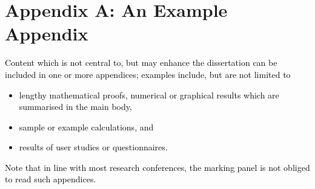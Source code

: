 \documentclass[a4paper]{article}
\newcommand\liststyleWWNumxix{%
\renewcommand\labelitemi{[F0B7?]}
\renewcommand\labelitemii{o}
\renewcommand\labelitemiii{[F0A7?]}
\renewcommand\labelitemiv{[F0B7?]}
}
\begin{document}
\bigskip

\clearpage
\bigskip


\bigskip

\section{Appendix A: An Example Appendix}
\hypertarget{Toc98342040}{}
\bigskip


\bigskip

\textcolor{black}{Content which is not central to, but may enhance the dissertation can be included in one or more
appendices; examples include, but are not limited to}


\bigskip

\liststyleWWNumxix
\begin{itemize}
\item \textcolor{black}{lengthy mathematical proofs, numerical or graphical results which are summarised in the main
body,}
\item \textcolor{black}{sample or example calculations, and}
\item \textcolor{black}{results of user studies or questionnaires.}
\end{itemize}

\bigskip

\textcolor{black}{Note that in line with most research conferences, the marking panel is not obliged to read such
appendices.}


\bigskip


\bigskip


\bigskip
\end{document}
